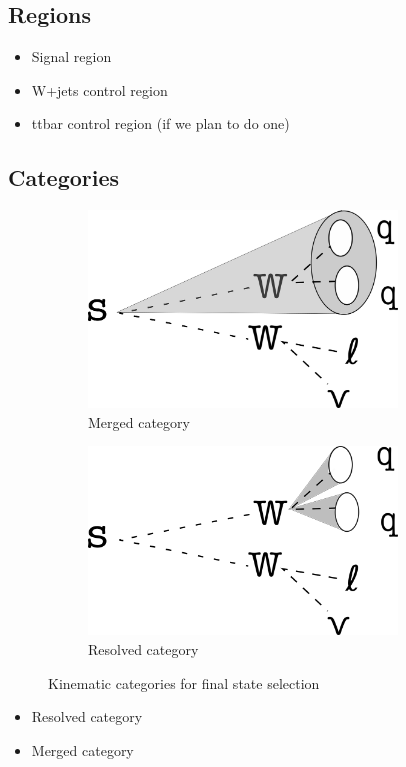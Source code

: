 \documentclass[12pt]{article}
\begin{document}
\subsection{Regions}
\begin{itemize}
\item Signal region
\item W+jets control region
\item ttbar control region (if we plan to do one)
\end{itemize}
\subsection{Categories}
\begin{figure}[H]
     \centering
     \begin{subfigure}[b]{0.4\textwidth}
         \centering
         \includegraphics[width=0.9\textwidth]{figures/merged.png}
         \caption[]{Merged category}
         \label{fig:merged}
     \end{subfigure}
     \hfill
     \begin{subfigure}[b]{0.4\textwidth}
         \centering
         \includegraphics[width=0.9\textwidth]{figures/resolved.png}
         \caption[]{Resolved category}
         \label{fig:resolved}
     \end{subfigure}
\caption[]{Kinematic categories for final state selection}
\label{fig:categories}
\end{figure}
\begin{itemize}
\item Resolved category
\item Merged category
\end{itemize}
\end{document}
